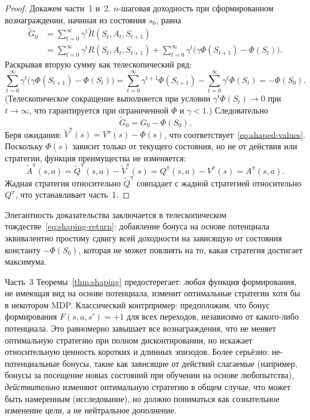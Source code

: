 \begin{proof}
Докажем части~1 и~2. $n$-шаговая доходность при сформированном вознаграждении, начиная из состояния $s_0$, равна
\begin{align*}
\tilde{G}_0 &= \sum_{t=0}^{\infty} \gamma^t \tilde{R}(S_t, A_t, S_{t+1}) \\
&= \sum_{t=0}^{\infty} \gamma^t R(S_t, A_t, S_{t+1})
   + \sum_{t=0}^{\infty} \gamma^t \bigl(\gamma\Phi(S_{t+1}) - \Phi(S_t)\bigr).
\end{align*}
Раскрывая вторую сумму как телескопический ряд:
\[
\sum_{t=0}^{\infty} \gamma^t \bigl(\gamma\Phi(S_{t+1}) - \Phi(S_t)\bigr)
= \sum_{t=0}^{\infty} \gamma^{t+1}\Phi(S_{t+1}) - \sum_{t=0}^{\infty} \gamma^t\Phi(S_t)
= -\Phi(S_0).
\]
(Телескопическое сокращение выполняется при условии $\gamma^t \Phi(S_t) \to 0$ при $t\to\infty$, что гарантируется при ограниченной $\Phi$ и $\gamma < 1$.) Следовательно
\begin{equation}
\label{eq:shaping-return}
\tilde{G}_0 = G_0 - \Phi(S_0).
\end{equation}
Беря ожидания: $\tilde{V}^\pi(s) = V^\pi(s) - \Phi(s)$, что соответствует~\eqref{eq:shaped-values}. Поскольку $\Phi(s)$ зависит только от текущего состояния, но не от действия или стратегии, функция преимущества не изменяется:
\[
\tilde{A}^\pi(s,a) = \tilde{Q}^\pi(s,a) - \tilde{V}^\pi(s) = Q^\pi(s,a) - V^\pi(s) = A^\pi(s,a).
\]
Жадная стратегия относительно $\tilde{Q}^\pi$ совпадает с жадной стратегией относительно $Q^\pi$, что устанавливает часть~1.
\end{proof}

Элегантность доказательства заключается в телескопическом тождестве~\eqref{eq:shaping-return}: добавление бонуса на основе потенциала эквивалентно простому сдвигу всей доходности на зависящую от состояния константу $-\Phi(S_0)$, которая не может повлиять на то, какая стратегия достигает максимума.

\begin{remark}
\label{rem:non-potential}
Часть~3 Теоремы~\ref{thm:shaping} предостерегает: \emph{любая} функция формирования, не имеющая вид на основе потенциала, изменит оптимальные стратегии хотя бы в некотором MDP. Классический контрпример: предположим, что бонус формирования $F(s,a,s') = +1$ для всех переходов, независимо от какого-либо потенциала. Это равномерно завышает все вознаграждения, что не меняет оптимальную стратегию при полном дисконтировании, но искажает относительную ценность коротких и длинных эпизодов. Более серьёзно: не-потенциальные бонусы, такие как зависящие от действий слагаемые (например, бонусы за посещение новых состояний при обучении на основе любопытства), \emph{действительно} изменяют оптимальную стратегию в общем случае, что может быть намеренным (исследование), но должно пониматься как сознательное изменение цели, а не нейтральное дополнение.
\end{remark}

